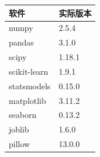 \begin{center}
\small
\setlength{\tabcolsep}{5pt}
\renewcommand{\arraystretch}{1.25}
\begin{tabular}{ll}
\toprule
软件 & 实际版本 \tabularnewline
\midrule
numpy & 2.5.4 \tabularnewline
pandas & 3.1.0 \tabularnewline
scipy & 1.18.1 \tabularnewline
scikit-learn & 1.9.1 \tabularnewline
statsmodels & 0.15.0 \tabularnewline
matplotlib & 3.11.2 \tabularnewline
seaborn & 0.13.2 \tabularnewline
joblib & 1.6.0 \tabularnewline
pillow & 13.0.0 \tabularnewline
\bottomrule
\end{tabular}
\end{center}
